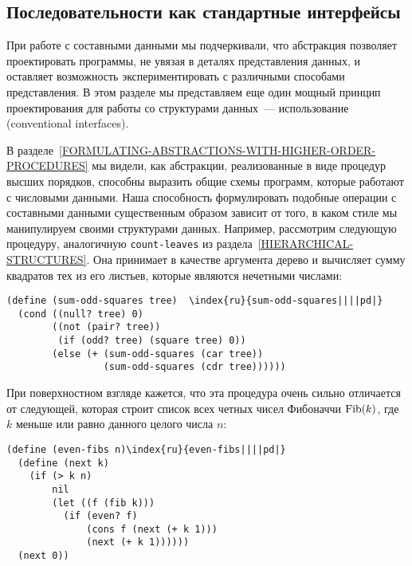 \subsection{Последовательности как стандартные интерфейсы}
\label{SEQUENCES-AS-CONVENTIONAL-INTERFACES}


При работе с составными данными мы
подчеркивали,
что абстракция позволяет проектировать программы, не увязая в деталях
представления данных, и оставляет возможность
экспериментировать с различными способами представления.  В этом
разделе мы представляем еще один мощный принцип проектирования для
работы со структурами данных~--- использование 
 (conventional interfaces).

В разделе~\ref{FORMULATING-ABSTRACTIONS-WITH-HIGHER-ORDER-PROCEDURES} 
мы видели, как абстракции, реализованные в виде процедур высших
порядков, способны выразить общие схемы программ, которые работают с
числовыми данными.  Наша способность формулировать подобные операции с 
составными данными существенным образом зависит от того, в каком стиле 
мы манипулируем своими структурами данных.  Например, рассмотрим
следующую процедуру, аналогичную {\tt count-leaves} из
раздела~\ref{HIERARCHICAL-STRUCTURES}.  Она принимает
в качестве аргумента дерево и вычисляет сумму квадратов тех из его
листьев, которые являются нечетными числами:

\begin{Verbatim}[fontsize=\small]
(define (sum-odd-squares tree)  \index{ru}{sum-odd-squares||||pd|}
  (cond ((null? tree) 0)
        ((not (pair? tree))
         (if (odd? tree) (square tree) 0))
        (else (+ (sum-odd-squares (car tree))
                 (sum-odd-squares (cdr tree))))))
\end{Verbatim}
При поверхностном взгляде кажется, что эта процедура очень сильно
отличается от следующей, которая строит список всех четных чисел
Фибоначчи $\mathop{\rm Fib}(k)$, где $k$ меньше
или равно данного целого числа $n$:

\begin{Verbatim}[fontsize=\small]
(define (even-fibs n)\index{ru}{even-fibs||||pd|}
  (define (next k)
    (if (> k n)
        nil
        (let ((f (fib k)))
          (if (even? f)
              (cons f (next (+ k 1)))
              (next (+ k 1))))))
  (next 0))
\end{Verbatim}

